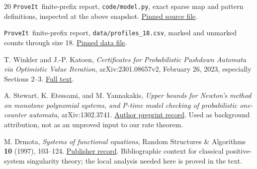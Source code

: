 \documentclass[11pt,a4paper]{article}
\theoremstyle{definition}
\theoremstyle{remark}
\newcommand{\repo}{\texttt{ProveIt}}
\begin{document}
\begin{thebibliography}{20}
\repo\ finite-prefix report, \texttt{code/model.py},
exact sparse map and pattern definitions, inspected at the above snapshot.
\href{https://github.com/VladimirReshetnikov/ProveIt/blob/74f7f5bdba1aa728b340509701a0fa4e45e8dbf3/SetTheory/Cardinals/docs/reports/enumerative-combinatorics/polyomino-growth-finite-prefix-corrections/code/model.py}{Pinned source file}.

\repo\ finite-prefix report, \texttt{data/profiles\_18.csv},
marked and unmarked counts through size 18.
\href{https://github.com/VladimirReshetnikov/ProveIt/blob/74f7f5bdba1aa728b340509701a0fa4e45e8dbf3/SetTheory/Cardinals/docs/reports/enumerative-combinatorics/polyomino-growth-finite-prefix-corrections/data/profiles_18.csv}{Pinned data file}.

T. Winkler and J.-P. Katoen,
\emph{Certificates for Probabilistic Pushdown Automata via Optimistic Value
Iteration}, arXiv:2301.08657v2, February 26, 2023, especially Sections 2--3.
\href{https://arxiv.org/html/2301.08657v2}{Full text}.

A. Stewart, K. Etessami, and M. Yannakakis,
\emph{Upper bounds for Newton's method on monotone polynomial systems,
and P-time model checking of probabilistic one-counter automata},
arXiv:1302.3741.
\href{https://arxiv.org/abs/1302.3741}{Author preprint record}.
Used as background attribution, not as an unproved input to our rate theorem.

M. Drmota, \emph{Systems of functional equations},
Random Structures \& Algorithms \textbf{10} (1997), 103--124.
\href{https://doi.org/10.1002/(SICI)1098-2418(199701/03)10:1/2<103::AID-RSA5>3.0.CO;2-Z}{Publisher record}.
Bibliographic context for classical positive-system singularity theory;
the local analysis needed here is proved in the text.
\end{thebibliography}
\end{document}

